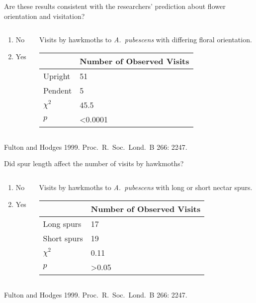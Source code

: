 \documentclass[t,handout]{beamer}  %
\newcommand{\ques}[1]{\highlight{\textsc{q#1:}}}
\begin{document}
\begin{frame}[t]{\ques{11} Are these results consistent with the researchers’ prediction about flower orientation and visitation?}
	
	\begin{columns}[t]
		\begin{column}{0.28\textwidth}
			\begin{enumerate}
				\item No
				\item \alert<2>{Yes}
			\end{enumerate}
		\end{column}
		\begin{column}{0.5\textwidth}
	Visits by hawkmoths to \textit{A.~pubescens} with differing floral orientation.
	
			\begin{tabular}{L{0.6in}R{1in}}
				\toprule
				& Number of Observed Visits \tabularnewline
				\midrule
				Upright		&	51	 \tabularnewline
				Pendent		&	5	 \tabularnewline
				$\chi^2$	&	45.5 \tabularnewline
				$p$			&  \textless0.0001 \tabularnewline
				\bottomrule
			\end{tabular}
		\end{column}
	\end{columns}

	\vfilll
	
	\hfill \tiny Fulton and Hodges 1999. Proc.~R.~Soc.~Lond.~B 266: 2247.

\end{frame}
%
\begin{frame}[t]{\ques{12} Did spur length affect the number of visits by hawkmoths?}
	
	\begin{columns}[t]
		\begin{column}{0.28\textwidth}
			\begin{enumerate}
				\item \alert<2>{No}
				\item Yes
			\end{enumerate}
		\end{column}
		\begin{column}{0.5\textwidth}
			Visits by hawkmoths to \textit{A.~pubescens} with long or short nectar spurs.
			
			\begin{tabular}{L{0.75in}R{1in}}
				\toprule
				& Number of Observed Visits \tabularnewline
				\midrule
				Long spurs		&	17	 \tabularnewline
				Short spurs		&	19	 \tabularnewline
				$\chi^2$		&	0.11 \tabularnewline
				$p$				&  \textgreater0.05 \tabularnewline
				\bottomrule
			\end{tabular}
		\end{column}
	\end{columns}

	\vfilll
	
	\hfill \tiny Fulton and Hodges 1999. Proc.~R.~Soc.~Lond.~B 266: 2247.

\end{frame}
\end{document}
